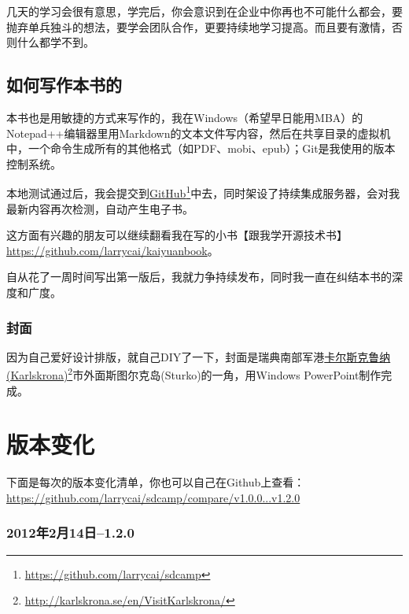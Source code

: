 几天的学习会很有意思，学完后，你会意识到在企业中你再也不可能什么都会，要抛弃单兵独斗的想法，要学会团队合作，更要持续地学习提高。而且要有激情，否则什么都学不到。

\section{如何写作本书的}
\label{如何写作本书的}

本书也是用敏捷的方式来写作的，我在Windows（希望早日能用MBA）的Notepad++编辑器里用Markdown的文本文件写内容，然后在共享目录的虚拟机中，一个命令生成所有的其他格式（如PDF、mobi、epub）；Git是我使用的版本控制系统。

本地测试通过后，我会提交到\href{https://github.com/larrycai/sdcamp}{GitHub}\footnote{\href{https://github.com/larrycai/sdcamp}{https:/\slash github.com\slash larrycai\slash sdcamp}}中去，同时架设了持续集成服务器，会对我最新内容再次检测，自动产生电子书。

这方面有兴趣的朋友可以继续翻看我在写的小书【跟我学开源技术书】 \href{https://github.com/larrycai/kaiyuanbook}{https:/\slash github.com\slash larrycai\slash kaiyuanbook}。

自从花了一周时间写出第一版后，我就力争持续发布，同时我一直在纠结本书的深度和广度。

\subsection{封面}
\label{封面}

因为自己爱好设计排版，就自己DIY了一下，封面是瑞典南部军港\href{http://karlskrona.se/en/VisitKarlskrona/}{卡尔斯克鲁纳(Karlskrona)}\footnote{\href{http://karlskrona.se/en/VisitKarlskrona/}{http:/\slash karlskrona.se\slash en\slash VisitKarlskrona\slash }}市外面斯图尔克岛(Sturko)的一角，用Windows PowerPoint制作完成。

\chapter{版本变化}
\label{版本变化}

下面是每次的版本变化清单，你也可以自己在Github上查看：\href{https://github.com/larrycai/sdcamp/compare/v1.0.0...v1.2.0}{https:/\slash github.com\slash larrycai\slash sdcamp\slash compare\slash v1.0.0...v1.2.0}

\subsection{2012年2月14日--1.2.0}
\label{2012年2月14日-1.2.0}

